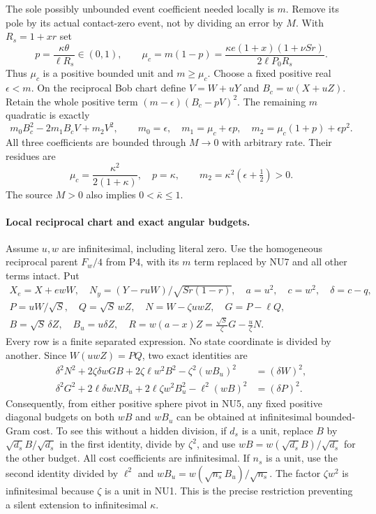 The sole possibly unbounded event coefficient needed locally is
$m$. Remove its pole by its actual contact-zero event, not by
dividing an error by $M$. With $R_s=1+xr$ set
\[
 p=\frac{\kappa\theta}{\ell R_s}\in(0,1),\qquad
 \mu_c=m(1-p)=
 \frac{\kappa e(1+x)(1+\nu Sr)}{2\ell P_0R_s}.
 \tag{NU6}
\]
Thus $\mu_c$ is a positive bounded unit and $m\ge\mu_c$.
Choose a fixed positive real $\epsilon<m$. On the reciprocal
Bob chart define $V=W+uY$ and $B_c=w(X+uZ)$. Retain the whole
positive term $(m-\epsilon)(B_c-pV)^2$. The remaining $m$
quadratic is exactly
\[
 m_0B_c^2-2m_1B_cV+m_2V^2,\qquad
 m_0=\epsilon,\quad m_1=\mu_c+\epsilon p,\quad
 m_2=\mu_c(1+p)+\epsilon p^2.
 \tag{NU7}
\]
All three coefficients are bounded through $M\to0$ with arbitrary
rate. Their residues are
\[
 \mu_c=\frac{\kappa^2}{2(1+\kappa)},\quad p=\kappa,
 \qquad m_2=\kappa^2(\epsilon+\tfrac12)>0.
 \tag{NU8}
\]
The source $M>0$ also implies $0<\bar\kappa\le1$.

\paragraph{Local reciprocal chart and exact angular budgets.}
Assume $u,w$ are infinitesimal, including literal zero. Use
the homogeneous reciprocal parent $F_w/4$ from P4, with its
$m$ term replaced by NU7 and all other terms intact. Put
\[
\begin{gathered}
 X_e=X+ewW,\quad N_y=(Y-ruW)/\sqrt{Sr(1-r)},\quad
 a=u^2,\quad c=w^2,\quad \delta=c-q,\\
 P=uW/\sqrt S,\quad Q=\sqrt S\,wZ,\quad
 N=W-\zeta uwZ,\quad G=P-\ell Q,\\
 B=\sqrt S\,\delta Z,\quad B_u=u\delta Z,\quad
 R=w(a-x)Z=\frac{\sqrt S}{\zeta}G-\frac u\zeta N.
\end{gathered}\tag{NU9}
\]
Every row is a finite separated expression. No state coordinate
is divided by another. Since $W(uwZ)=PQ$, two exact identities are
\[
\begin{split}
 \delta^2N^2+2\zeta\delta wGB+2\zeta\ell w^2B^2
                  -\zeta^2(wB_u)^2&=(\delta W)^2,\\
 \delta^2G^2+2\ell\delta wNB_u+2\ell\zeta w^2B_u^2
                  -\ell^2(wB)^2&=(\delta P)^2.
\end{split}\tag{NU10}
\]
Consequently, from either positive sphere pivot in NU5, any fixed
positive diagonal budgets on both $wB$ and $wB_u$ can be obtained
at infinitesimal bounded-Gram cost. To see this without a hidden
division, if $d_s$ is a unit, replace $B$ by
$\sqrt{d_s}B/\sqrt{d_s}$ in the first identity, divide by
$\zeta^2$, and use $wB=w(\sqrt{d_s}B)/\sqrt{d_s}$ for the
other budget. All cost coefficients are infinitesimal. If $n_s$
is a unit, use the second identity divided by $\ell^2$ and
$wB_u=w(\sqrt{n_s}B_u)/\sqrt{n_s}$. The factor
$\zeta w^2$ is infinitesimal because $\zeta$ is a unit in
NU1. This is the precise restriction preventing a silent extension
to infinitesimal $\kappa$.

